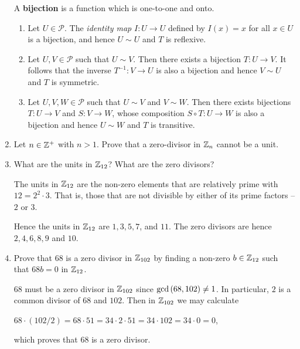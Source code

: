 \documentclass[11pt,fleqn,dvipsnames,usenames]{article}
\begin{document}
\begin{enumerate}
\recall A \textbf{bijection} is a function which is one-to-one and onto.
\vsmsp

\solution
\begin{enumerate}[(1)]
\item Let $U\in \mathcal{P}$.  The \textit{identity map} $I:U\to U$ defined by $I(x) = x$ for all $x\in U$ is a bijection, and hence $U\sim U$ and $T$ is reflexive.
\item Let $U,V\in\mathcal{P}$ such that $U\sim V$.  Then there exists a bijection $T:U\to V$.  It follows that the inverse $T^{-1}:V\to U$ is also a bijection and hence $V\sim U$ and $T$ is symmetric.
\item Let $U,V, W\in\mathcal{P}$ such that $U\sim V$ and $V\sim W$.  Then there exists bijections $T:U\to V$ and $S:V\to W$, whose composition $S\circ T:U\to W$ is also a bijection and hence $U\sim W$ and $T$ is transitive.
\end{enumerate}
\item Let $n\in\mathbb{Z}^+$ with $n > 1$.  Prove that a zero-divisor in $\mathbb{Z}_n$ cannot be a unit.


\item What are the units in $\mathbb{Z}_{12}$?  What are the zero divisors?
\vsmsp

\solution The units in $\mathbb{Z}_{12}$ are the non-zero elements that are relatively prime with $12 = 2^2\cdot 3$.  That is, those that are not divisible by either of its prime factors -- $2$ or $3$.
\vsmsp

Hence the units in $\mathbb{Z}_{12}$ are $1, 3, 5, 7$, and $11$.  The zero divisors are hence $2,4,6,8,9$ and $10$.
\item Prove that $68$ is a zero divisor in $\mathbb{Z}_{102}$ by finding a non-zero $b\in\mathbb{Z}_{12}$ such that $68b = 0$ in $\mathbb{Z}_{12}$.
\vsmsp

\solution $68$ must be a zero divisor in $\mathbb{Z}_{102}$ since $\text{gcd}\left(68,102\right)\neq 1$.  In particular, $2$ is a common divisor of $68$ and $102$.  Then in $\mathbb{Z}_{102}$ we may calculate
\begin{center}
$68\cdot (102/2) = 68\cdot 51 = 34\cdot 2\cdot 51 = 34\cdot 102 = 34\cdot 0 = 0$,
\end{center}
which proves that $68$ is a zero divisor.


\end{enumerate}
\end{document}
